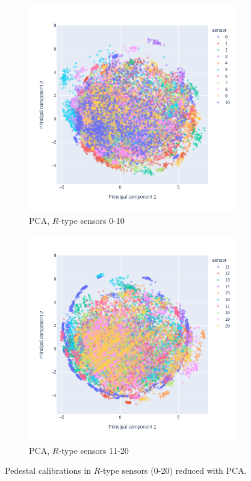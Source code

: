 \begin{figure}
\centering
  \begin{subfigure}[b]{0.7\textwidth}
    \centering
    \includegraphics[width=\linewidth]{figures/chapter4/dimred/PCA_pedestals_r_phi_0.png}
    \caption{PCA, $R$-type sensors 0-10}
    \label{plot:PCA_pedestals_0}
  \end{subfigure}
  \begin{subfigure}[b]{0.7\textwidth}
    \centering
    \includegraphics[width=\linewidth]{figures/chapter4/dimred/PCA_pedestals_r_phi_1.png}
    \caption{PCA, $R$-type sensors 11-20}
    \label{plot:PCA_pedestals_1}
  \end{subfigure}


\caption[All calibrationa]{Pedestal calibrations in $R$-type sensors (0-20) reduced with PCA.}
\label{plot:pca_all_peda}
\end{figure}

